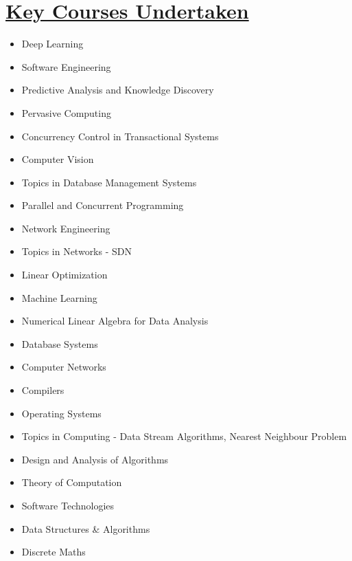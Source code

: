 \documentclass[8pt]{extarticle}
\newcommand{\heading}[1]{
\section*{\color{red}\underline{#1}}
}
\begin{document}
\heading{Key Courses Undertaken}
\begin{multicols}{2}
\begin{itemize}
\item Deep Learning
\item Software Engineering
\item Predictive Analysis and Knowledge Discovery
\item Pervasive Computing
\item Concurrency Control in Transactional Systems
\item Computer Vision
\item Topics in Database Management Systems
\item Parallel and Concurrent Programming
\item Network Engineering
\item Topics in Networks - SDN
\item Linear Optimization
\item Machine Learning
\item Numerical Linear Algebra for Data Analysis
\item Database Systems
\item Computer Networks
\item Compilers
\item Operating Systems
\item Topics in Computing - Data Stream Algorithms, Nearest Neighbour Problem
\item Design and Analysis of Algorithms
\item Theory of Computation
\item Software Technologies
\item Data Structures \& Algorithms
\item Discrete Maths
\end{itemize}
\end{multicols}
\end{document}
